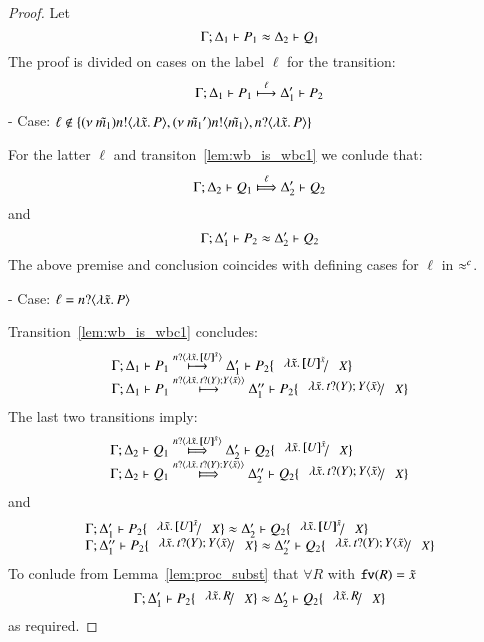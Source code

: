 \begin{proof}
	Let
	\[
		\Gamma; \Delta_1 \vdash P_1 \approx \Delta_2 \vdash Q_1
	\]
	The proof is divided on cases on the label $\ell$ for the transition:
%
	\begin{eqnarray}
		\Gamma; \Delta_1 \vdash P_1 \stackrel{\ell}{\longmapsto} \Delta_1' \vdash P_2
		\label{lem:wb_is_wbc1}
	\end{eqnarray}
%
	\noi - Case: $\ell \notin \{ (\nu\ \tilde{m_1}) n ! \langle \lambda \tilde{x}.\,P \rangle,  (\nu\ \tilde{m_1}') n ! \langle \tilde{m_1} \rangle, n ? \langle \lambda \tilde{x}.\,P \rangle \}$

	\noi For the latter $\ell$ and transiton~\ref{lem:wb_is_wbc1} we conlude that:	
%
	\[
		\horel{\Gamma}{\Delta_2}{Q_1}{\Hby{\ell}}{\Delta_2'}{Q_2}
	\]
%
	\noi and
%
	\[
		\Gamma; \Delta_1' \vdash P_2 \approx \Delta_2' \vdash Q_2
	\]
%
	The above premise and conclusion coincides with defining cases for $\ell$ in $\approx^{c}$.

	\noi - Case: $\ell = n ? \langle \lambda \tilde{x}.\,P \rangle$

	\noi Transition~\ref{lem:wb_is_wbc1} concludes:
%
\[
	\begin{array}{l}
		\horel{\Gamma}{\Delta_1}{P_1}{\hby{\bactinp{n}{\abs{\tilde{x}}{\map{U}^{\tilde{x}}}}}}{\Delta_1'}{P_2 \subst{\abs{\tilde{x}}{\map{U}^{\tilde{x}}}}{X}}\\
		\horel{\Gamma}{\Delta_1}{P_1}{\hby{\bactinp{n}{\abs{\tilde{x}}{\binp{t}{Y} \appl{Y}{\tilde{x}}}}}}{\Delta_1''}{P_2 \subst{\abs{\tilde{x}}{\binp{t}{Y} \appl{Y}{\tilde{x}}}}{X}}
	\end{array}
\]
%
	\noi The last two transitions imply:
%
\[
	\begin{array}{l}
		\horel{\Gamma}{\Delta_2}{Q_1}{\Hby{\bactinp{n}{\abs{\tilde{x}}{\map{U}^{\tilde{x}}}}}}{\Delta_2'}{Q_2 \subst{\abs{\tilde{x}}{\map{U}^{\tilde{x}}}}{X}}\\
		\horel{\Gamma}{\Delta_2}{Q_1}{\Hby{\bactinp{n}{\abs{\tilde{x}}{\binp{t}{Y} \appl{Y}{\tilde{x}}}}}}{\Delta_2''}{Q_2 \subst{\abs{\tilde{x}}{\binp{t}{Y} \appl{Y}{\tilde{x}}}}{X}}
	\end{array}
\]
%
	\noi and
%
\[
	\begin{array}{l}
		\horel{\Gamma}{\Delta_1'}{P_2 \subst{\abs{\tilde{x}}{\map{U}^{\tilde{x}}}}{X}}{\wb}{\Delta_2'}{Q_2 \subst{\abs{\tilde{x}}{\map{U}^{\tilde{x}}}}{X}}\\
		\horel{\Gamma}{\Delta_1''}{P_2 \subst{\abs{\tilde{x}}{\binp{t}{Y} \appl{Y}{\tilde{x}}}}{X}}{\wb}{\Delta_2''}{Q_2 \subst{\abs{\tilde{x}}{\binp{t}{Y} \appl{Y}{\tilde{x}}}}{X}}
	\end{array}
\]
%
	\noi To conlude from Lemma~\ref{lem:proc_subst} that
	$\forall R$ with $\mathtt{fv}(R) = \tilde{x}$
%
\[
	\horel{\Gamma}{\Delta_1'}{P_2 \subst{\abs{\tilde{x}}{R}}{X}}{\wb}{\Delta_2'}{Q_2 \subst{\abs{\tilde{x}}{R}}{X}}
\]
%
	\noi as required.


\end{proof}
